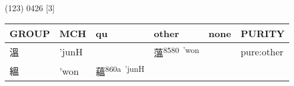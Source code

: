 \documentclass[14pt,a4paper]{scrartcl}
\begin{document}
(123) 0426 {[}3{]}

\begin{longtable}[c]{@{}llllll@{}}
\toprule
\begin{minipage}[b]{0.14\columnwidth}\raggedright\strut
GROUP
\strut\end{minipage} &
\begin{minipage}[b]{0.14\columnwidth}\raggedright\strut
MCH
\strut\end{minipage} &
\begin{minipage}[b]{0.14\columnwidth}\raggedright\strut
qu
\strut\end{minipage} &
\begin{minipage}[b]{0.14\columnwidth}\raggedright\strut
other
\strut\end{minipage} &
\begin{minipage}[b]{0.14\columnwidth}\raggedright\strut
none
\strut\end{minipage} &
\begin{minipage}[b]{0.14\columnwidth}\raggedright\strut
PURITY
\strut\end{minipage}\tabularnewline
\midrule
\endhead
\begin{minipage}[t]{0.14\columnwidth}\raggedright\strut
溫
\strut\end{minipage} &
\begin{minipage}[t]{0.14\columnwidth}\raggedright\strut
'junH
\strut\end{minipage} &
\begin{minipage}[t]{0.14\columnwidth}\raggedright\strut
\strut\end{minipage} &
\begin{minipage}[t]{0.14\columnwidth}\raggedright\strut
薀\textsuperscript{8580~'won}
\strut\end{minipage} &
\begin{minipage}[t]{0.14\columnwidth}\raggedright\strut
\strut\end{minipage} &
\begin{minipage}[t]{0.14\columnwidth}\raggedright\strut
pure:other
\strut\end{minipage}\tabularnewline
\begin{minipage}[t]{0.14\columnwidth}\raggedright\strut
縕
\strut\end{minipage} &
\begin{minipage}[t]{0.14\columnwidth}\raggedright\strut
'won
\strut\end{minipage} &
\begin{minipage}[t]{0.14\columnwidth}\raggedright\strut
蘊\textsuperscript{860a~'junH}

\end{minipage}
\end{longtable}
\end{document}
